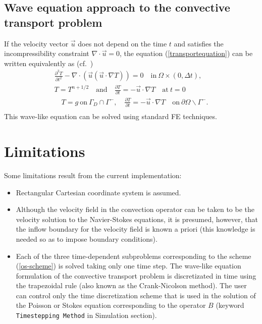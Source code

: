 \begin{versiona}
\subsection{Wave equation approach to the convective transport problem}
\label{Waveequationsection}

If the velocity vector $\vec u$ does not depend on the time $t$ and satisfies 
the incompressibility constraint $\nabla\cdot\vec u=0$, the equation 
(\ref{transportequation}) can be written equivalently as (cf.\ \cite{Wu97})
\begin{equation}
\begin{split}
\frac{\partial^2 T}{\partial t^2}-\nabla \cdot \left( \vec u(\vec u \cdot 
\nabla T) \right)=0 \quad  \mathrm{in}\ \Omega \times (0,\Delta t), \\
T=T^{n+1/2}\quad \mathrm{and}\quad 
\frac{\partial T}{\partial t}= -\vec u \cdot \nabla T\quad \mathrm{at}\ t=0 \\
\quad T=g \ \mathrm{on}\ \Gamma_D \cap \Gamma^-, \quad 
\frac{\partial T}{\partial t}= -\vec u \cdot \nabla T \quad \mathrm{on}\ 
\partial\Omega \backslash \Gamma^-. \\
\end{split}
\end{equation}
This wave-like equation can be solved using standard FE techniques.


\section{Limitations}

Some limitations result from the current implementation:
\begin{itemize}
\item Rectangular Cartesian coordinate system is assumed.

\item Although the velocity field in the convection operator can be taken to 
be the velocity solution to the Navier-Stokes equations, it is presumed, 
however, that the inflow boundary for the velocity field is known a priori
(this knowledge is needed so as to impose boundary conditions).
 
\item Each of the three time-dependent subproblems corresponding to the scheme 
(\ref{os-scheme}) is solved taking only one time step. 
The wave-like equation formulation of the convective transport problem
is discretizated in time using the 
trapezoidal rule (also known as the Crank-Nicolson method). The user can
control only the time discretization scheme that is used in the solution of
the Poisson or Stokes equation corresponding to the operator $B$ 
(keyword {\tt Timestepping Method} in Simulation section).  


\end{itemize}
\end{versiona}
